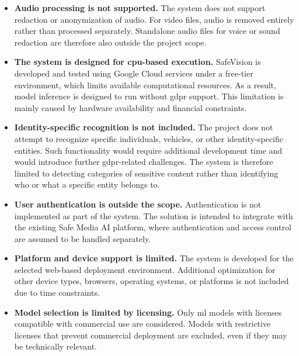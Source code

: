 \begin{itemize}
    \item \textbf{Audio processing is not supported.} 
    The system does not support redaction or \gls{anonymization} of audio. For video files, audio is removed entirely rather than processed separately. Standalone audio files for voice or sound redaction are therefore also outside the project scope.

    \medskip

    \item \textbf{The system is designed for \gls{cpu}-based execution.} 
    \gls{SafeVision} is developed and tested using Google Cloud services under a free-tier environment, which limits available computational resources. As a result, model \gls{inference} is designed to run without \gls{gdpr} support. This limitation is mainly caused by hardware availability and financial constraints.

    \medskip

    \item \textbf{Identity-specific recognition is not included.} 
    The project does not attempt to recognize specific individuals, vehicles, or other identity-specific entities. Such functionality would require additional development time and would introduce further \gls{gdpr}-related challenges. The system is therefore limited to detecting categories of sensitive content rather than identifying who or what a specific entity belongs to.

    \medskip

    \item \textbf{User authentication is outside the scope.} 
    Authentication is not implemented as part of the system. The solution is intended to integrate with the existing Safe Media AI platform, where authentication and access control are assumed to be handled separately.

    \medskip

    \item \textbf{Platform and device support is limited.} 
    The system is developed for the selected web-based deployment environment. Additional optimization for other device types, browsers, operating systems, or platforms is not included due to time constraints.

    \medskip

    \item \textbf{Model selection is limited by licensing.} 
    Only \acrshort{ml} models with licenses compatible with commercial use are considered. Models with restrictive licenses that prevent commercial deployment are excluded, even if they may be technically relevant.
\end{itemize}

